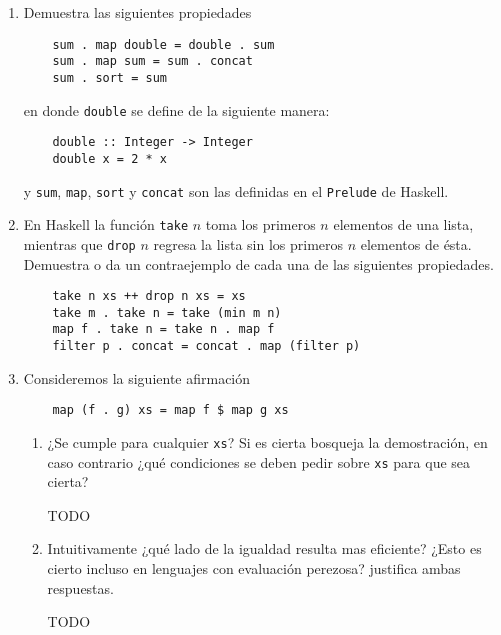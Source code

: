 \documentclass[11pt,letterpaper]{article}
\begin{document}
\begin{enumerate}
\item Demuestra las siguientes propiedades

\begin{verbatim}
    sum . map double = double . sum
    sum . map sum = sum . concat
    sum . sort = sum
\end{verbatim}

en donde \texttt{double} se define de la siguiente manera:

\begin{verbatim}
    double :: Integer -> Integer
    double x = 2 * x
\end{verbatim}

y \textcolor{WildStrawberry}{\texttt{sum}}, \textcolor{WildStrawberry}{\texttt{map}},
\textcolor{WildStrawberry}{\texttt{sort}} y \textcolor{WildStrawberry}{\texttt{concat}}
son las definidas en el \texttt{Prelude} de Haskell.

\item En Haskell la función \textcolor{WildStrawberry}{\texttt{take}} $n$ toma los primeros $n$
elementos de una lista, mientras que \textcolor{WildStrawberry}{\texttt{drop}} $n$
regresa la lista sin los primeros $n$ elementos de ésta. Demuestra o da un contraejemplo de cada
una de las siguientes propiedades.

\begin{verbatim}
    take n xs ++ drop n xs = xs
    take m . take n = take (min m n)
    map f . take n = take n . map f
    filter p . concat = concat . map (filter p)
\end{verbatim}


\item Consideremos la siguiente afirmación

\begin{verbatim}
    map (f . g) xs = map f $ map g xs
\end{verbatim}

\begin{enumerate}[label=\alph*)]
    
    \item ¿Se cumple para cualquier \texttt{xs}? Si es cierta bosqueja la demostración, en caso contrario
    ¿qué condiciones se deben pedir sobre \texttt{xs} para que sea cierta?

    TODO

    \item Intuitivamente ¿qué lado de la igualdad resulta mas eficiente? ¿Esto es cierto incluso en
    lenguajes con evaluación perezosa? justifica ambas respuestas.

    TODO

\end{enumerate}

\end{enumerate}



\end{document}
